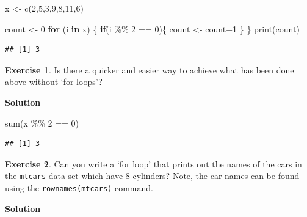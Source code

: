 \documentclass[
]{book}
\newenvironment{Shaded}{\begin{snugshade}}{\end{snugshade}}
\newcommand{\ControlFlowTok}[1]{\textcolor[rgb]{0.13,0.29,0.53}{\textbf{#1}}}
\newcommand{\DecValTok}[1]{\textcolor[rgb]{0.00,0.00,0.81}{#1}}
\newcommand{\FunctionTok}[1]{\textcolor[rgb]{0.00,0.00,0.00}{#1}}
\newcommand{\NormalTok}[1]{#1}
\newcommand{\OtherTok}[1]{\textcolor[rgb]{0.56,0.35,0.01}{#1}}
\newcommand{\SpecialCharTok}[1]{\textcolor[rgb]{0.00,0.00,0.00}{#1}}
\theoremstyle{definition}
\theoremstyle{definition}
\theoremstyle{definition}
\newtheorem{exercise}{Exercise}[chapter]
\theoremstyle{definition}
\theoremstyle{remark}
\begin{document}
\begin{Shaded}
\begin{Highlighting}[]
\NormalTok{x }\OtherTok{\textless{}{-}} \FunctionTok{c}\NormalTok{(}\DecValTok{2}\NormalTok{,}\DecValTok{5}\NormalTok{,}\DecValTok{3}\NormalTok{,}\DecValTok{9}\NormalTok{,}\DecValTok{8}\NormalTok{,}\DecValTok{11}\NormalTok{,}\DecValTok{6}\NormalTok{)}

\NormalTok{count }\OtherTok{\textless{}{-}} \DecValTok{0}
\ControlFlowTok{for}\NormalTok{ (i }\ControlFlowTok{in}\NormalTok{ x) \{}
  \ControlFlowTok{if}\NormalTok{(i }\SpecialCharTok{\%\%} \DecValTok{2} \SpecialCharTok{==} \DecValTok{0}\NormalTok{)\{}
\NormalTok{    count }\OtherTok{\textless{}{-}}\NormalTok{ count}\SpecialCharTok{+}\DecValTok{1}
\NormalTok{  \}}
\NormalTok{\}}
\FunctionTok{print}\NormalTok{(count)}
\end{Highlighting}
\end{Shaded}

\begin{verbatim}
## [1] 3
\end{verbatim}

\begin{exercise}
Is there a quicker and easier way to achieve what has been done above without `for loops'?
\end{exercise}

\textbf{Solution}

\begin{Shaded}
\begin{Highlighting}[]
\FunctionTok{sum}\NormalTok{(x }\SpecialCharTok{\%\%} \DecValTok{2} \SpecialCharTok{==} \DecValTok{0}\NormalTok{)}
\end{Highlighting}
\end{Shaded}

\begin{verbatim}
## [1] 3
\end{verbatim}

\begin{exercise}
Can you write a `for loop' that prints out the names of the cars in the \texttt{mtcars} data set which have 8 cylinders? Note, the car names can be found using the \texttt{rownames(mtcars)} command.
\end{exercise}

\textbf{Solution}

\begin{Shaded}
\end{Shaded}
\end{document}
